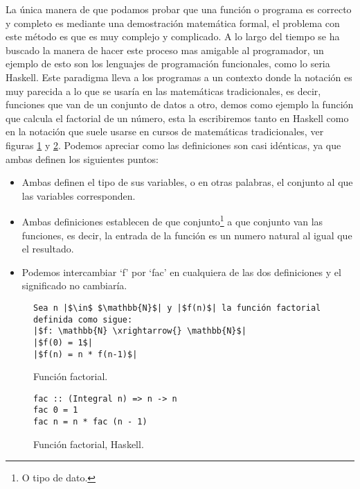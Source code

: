 La única manera de que podamos probar que una función o programa es correcto y completo es mediante
una demostraci\'on matemática formal, el problema con este método es que es muy complejo y
complicado. A lo largo del tiempo se ha buscado la manera de hacer este proceso mas amigable al
programador, un ejemplo de esto son los lenguajes de programación funcionales, como lo seria Haskell. Este paradigma lleva
a los programas a un contexto donde la notaci\'on es muy parecida a lo que se usar\'ia en las
matemáticas tradicionales, es decir, funciones que van de un conjunto de datos a otro, demos como ejemplo la funci\'on que calcula el factorial de un n\'umero, esta la escribiremos tanto en Haskell como en la notaci\'on que suele usarse en cursos de matemáticas tradicionales, ver figuras \ref{func_fact_math} y \ref{func_fact_hask}. 
Podemos apreciar como las definiciones son casi idénticas, ya que ambas definen los siguientes puntos:
\begin{itemize}
    \item Ambas definen el tipo de sus variables, o en otras palabras, el conjunto al que las variables corresponden.
    \item Ambas definiciones establecen de que conjunto\footnote{O tipo de dato.} a que conjunto van las funciones, es decir, la entrada de la funci\'on es un numero natural al igual que el resultado.
    \item Podemos intercambiar `f' por `fac' en cualquiera de las dos definiciones y el significado no cambiaría.
\end{itemize}

\begin{figure}
\centering
\captionsetup{justification=centering}
\begin{verbatim}
Sea n |$\in$ $\mathbb{N}$| y |$f(n)$| la función factorial definida como sigue:
|$f: \mathbb{N} \xrightarrow{} \mathbb{N}$|
|$f(0) = 1$|
|$f(n) = n * f(n-1)$|
\end{verbatim}
\caption{Funci\'on factorial.}
\label{func_fact_math}
\end{figure}

\begin{figure}
\centering
\captionsetup{justification=centering}
\begin{verbatim}
fac :: (Integral n) => n -> n
fac 0 = 1
fac n = n * fac (n - 1)
\end{verbatim}
\caption{Funci\'on factorial, Haskell.}
\label{func_fact_hask}
\end{figure}

